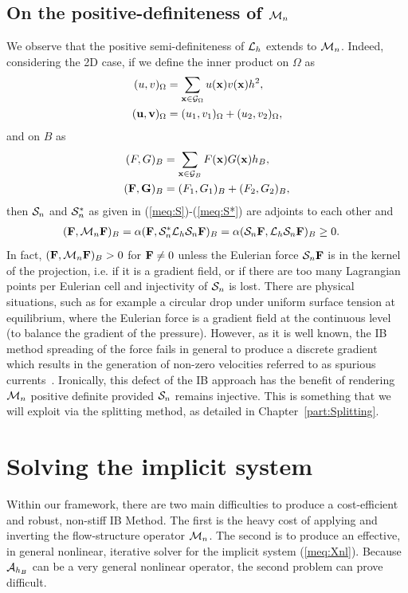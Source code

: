 \subsection{On the positive-definiteness of $\mathcal{M}_n$}
We observe that the positive semi-definiteness of $\mathcal{L}_h$ extends to $\mathcal{M}_n$. Indeed, considering the 2D case, if we define the inner product on $\Omega$ as
\begin{align}
(u,v)_{\Omega} &= \sum_{\mathbf{x} \in \mathcal{G}_\Omega} u(\mathbf{x})v(\mathbf{x})h^2,\label{meq:innero} \\
(\mathbf{u},\mathbf{v})_{\Omega} &=  (u_1,v_1)_{\Omega} + (u_2,v_2)_{\Omega},
\end{align}
and on $B$ as
\begin{align}
(F,G)_{B} &= \sum_{\mathbf{x} \in \mathcal{G}_B} F(\mathbf{x})G(\mathbf{x})h_B,\label{meq:innerb} \\
(\mathbf{F},\mathbf{G})_{B} &= (F_1,G_1)_{B} + (F_2,G_2)_{B},
\end{align}
then  $\mathcal{S}_n$ and $\mathcal{S}_n^*$ as given in (\ref{meq:S})-(\ref{meq:S*}) are adjoints to each other 
and
\begin{align}
( \mathbf{F}, \mathcal{M}_n\mathbf{F} )_{B} &= \alpha ( \mathbf{F},\mathcal{S}^*_n\mathcal{L}_h\mathcal{S}_n \mathbf{F})_{B} =\alpha ( \mathcal{S}_n\mathbf{F}, \mathcal{L}_h\mathcal{S}_n\mathbf{F})_{B}\geq 0.
\end{align}
In fact, $( \mathbf{F}, \mathcal{M}_n\mathbf{F} )_{B}>0$ for $\mathbf{F} \neq 0$ unless the Eulerian force $\mathcal{S}_n \mathbf{F}$ is in the kernel of the projection, i.e. if it is a gradient field,  or if there are too many Lagrangian points per Eulerian cell and injectivity of $\mathcal{S}_n$ is lost. There are physical situations, such as for example a circular drop under uniform surface tension at equilibrium, where the Eulerian force is a gradient field at the continuous level (to balance the gradient of the pressure). However, as it is well 
known, the IB method spreading of the force fails in general to produce a discrete gradient which results in the generation of non-zero velocities referred to as spurious currents~\cite{Tryg01}.  Ironically, this defect of the IB approach has the benefit of rendering  $ \mathcal{M}_n$ positive definite provided $\mathcal{S}_n$ remains injective. This is something that we will exploit via the splitting method, as detailed in Chapter~\ref{part:Splitting}.



\section{Solving the implicit system}
\label{Sec:Solving}
Within our framework, there are two main difficulties to produce a cost-efficient and robust, non-stiff IB Method. 
The first is the heavy cost of applying and inverting the flow-structure operator $\mathcal{M}_n$. The second is to produce an effective, in general nonlinear, iterative solver 
for the implicit system (\ref{meq:Xnl}).  Because $\mathcal{A}_{h_B}$ can be a very general nonlinear operator, the second problem can prove difficult.

